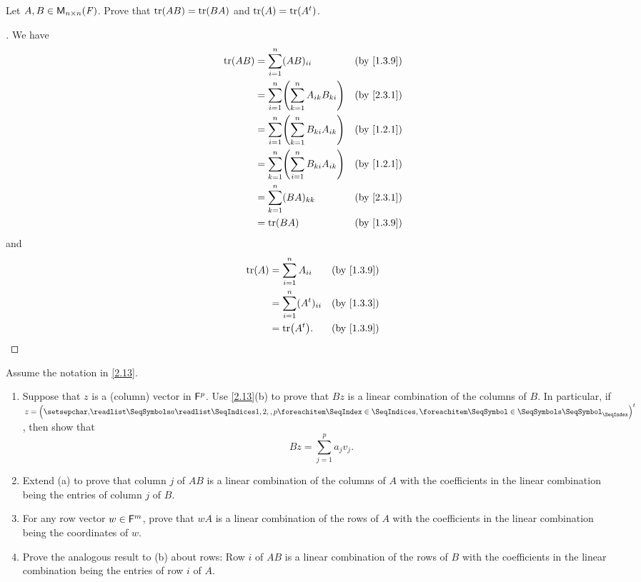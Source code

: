 \begin{ex}\label{ex:2.3.13}
	Let \(A, B \in \ms[n][n][\F]\).
	Prove that \(\tr[AB] = \tr[BA]\) and \(\tr[A] = \tr[\tp{A}]\).
\end{ex}

\begin{proof}[]
	We have
	\begin{align*}
		\tr[AB] & = \sum_{i = 1}^n (AB)_{i i}                          &  & \by{1.3.9} \\
		        & = \sum_{i = 1}^n \pa{\sum_{k = 1}^n A_{i k} B_{k i}} &  & \by{2.3.1} \\
		        & = \sum_{i = 1}^n \pa{\sum_{k = 1}^n B_{k i} A_{i k}} &  & \by{1.2.1} \\
		        & = \sum_{k = 1}^n \pa{\sum_{i = 1}^n B_{k i} A_{i k}} &  & \by{1.2.1} \\
		        & = \sum_{k = 1}^n (BA)_{k k}                          &  & \by{2.3.1} \\
		        & = \tr[BA]                                            &  & \by{1.3.9}
	\end{align*}
	and
	\begin{align*}
		\tr[A] & = \sum_{i = 1}^n A_{i i}        &  & \by{1.3.9} \\
		       & = \sum_{i = 1}^n (\tp{A})_{i i} &  & \by{1.3.3} \\
		       & = \tr[\tp{A}].                  &  & \by{1.3.9}
	\end{align*}
\end{proof}

\begin{ex}\label{ex:2.3.14}
	Assume the notation in \cref{2.13}.
	\begin{enumerate}
		\item Suppose that \(z\) is a (column) vector in \(\mathsf{F}^p\).
		      Use \cref{2.13}(b) to prove that \(Bz\) is a linear combination of the columns of \(B\).
		      In particular, if \(z = \tp{\tuple{a}{1,2,,p}}\), then show that
		      \[
			      Bz = \sum_{j = 1}^p a_j v_j.
		      \]
		\item Extend (a) to prove that column \(j\) of \(AB\) is a linear combination of the columns of \(A\) with the coefficients in the linear combination being the entries of column \(j\) of \(B\).
		\item For any row vector \(w \in \mathsf{F}^m\), prove that \(wA\) is a linear combination of the rows of \(A\) with the coefficients in the linear combination being the coordinates of \(w\).
		\item Prove the analogous result to (b) about rows:
		      Row \(i\) of \(AB\) is a linear combination of the rows of \(B\) with the coefficients in the linear combination being the entries of row \(i\) of \(A\).
	\end{enumerate}
\end{ex}

